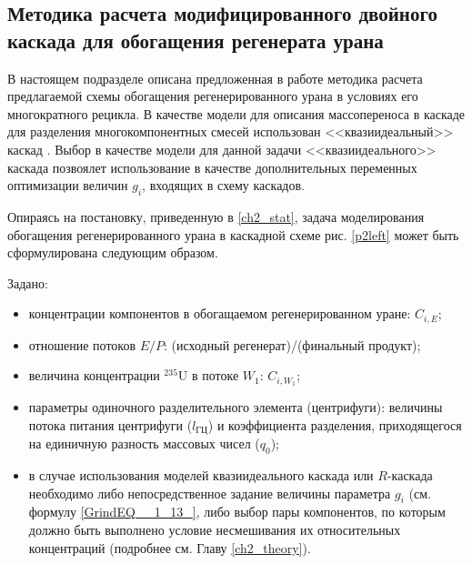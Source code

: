 
\subsection{Методика расчета модифицированного двойного каскада для обогащения регенерата урана}\label{statement}

В настоящем подразделе описана предложенная в работе методика расчета предлагаемой схемы обогащения регенерированного урана в условиях его многократного рецикла. В качестве модели для описания массопереноса в каскаде для разделения многокомпонентных смесей использован <<квазиидеальный>> каскад \cite{sazykinKvaziidealnyeKaskadyDlya2000}. Выбор в качестве модели для данной задачи <<квазиидеального>> каскада позвоялет использование в качестве дополнительных переменных оптимизации величин $g_{i}$, входящих в схему каскадов. 


Опираясь на постановку, приведенную в \ref{ch2_stat}, задача моделирования обогащения регенерированного урана в каскадной схеме рис. \ref{p2left} может быть сформулирована следующим образом.

Задано:

\begin{itemize}
    \item концентрации компонентов в обогащаемом регенерированном уране: $C_{i,{E}}$; 
    \item отношение потоков $E/P$: (исходный регенерат)/(финальный продукт);
    \item величина концентрации $^{235}$U в потоке $W_{1}$: $C_{i,{W_1}}$;
    \item параметры одиночного разделительного элемента (центрифуги): величины потока питания центрифуги ($l_\textit{ГЦ}$) и коэффициента разделения, приходящегося на единичную разность массовых чисел ($q_{0}$);
    \item в случае использования моделей квазиидеального каскада или $R$-каскада необходимо либо непосредственное задание величины параметра $g_i$ (см. формулу \ref{GrindEQ__1_13_}, либо выбор пары компонентов, по которым должно быть выполнено условие несмешивания их относительных концентраций (подробнее см. Главу \ref{ch2_theory}).
\end{itemize}

